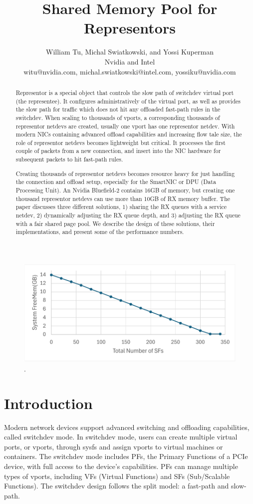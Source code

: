 \documentclass[letterpaper]{article}
\title{Shared Memory Pool for Representors}
\author{William Tu, Michal Swiatkowski, and Yossi Kuperman\\
Nvidia and Intel\\
witu@nvidia.com, michal.swiatkowski@intel.com, yossiku@nvidia.com\\
\newline
\newline
}
\begin{document}
 
\maketitle

\begin{abstract}
Representor is a special object that controls the slow path of
switchdev virtual port (the representee). It configures administratively
of the virtual port, as well as provides the slow path for traffic which
does not hit any offloaded fast-path rules in the switchdev.
When scaling to thousands of vports, a corresponding thousands of
representor netdevs are created, usually one vport has one representor
netdev. With modern NICs containing advanced offload capabilities
and increasing flow tale size, the role of representor netdevs becomes
lightweight but critical. It processes the first couple of packets
from a new connection, and insert into the NIC hardware for
subsequent packets to hit fast-path rules. 

Creating thousands of representor netdevs becomes resource heavy for
just handling the connection and offload setup, especially for the SmartNIC or
DPU (Data Processing Unit). An Nvidia Bluefield-2 contains 16GB
of memory, but creating one thousand representor netdevs can use
more than 10GB of RX memory buffer.
The paper discusses three different solutions, 1) sharing the RX queues
with a service netdev, 2) dynamically adjusting the RX queue depth,
and 3) adjusting the RX queue with a fair shared page pool.
We describe the design of these solutions, their implementations,
and present some of the performance numbers.


\end{abstract}
\begin{figure}[h]
\includegraphics[width=3.2
in]{freemem.pdf}
\caption{.}
\label{fig:arch}
\end{figure}

\section{Introduction}
Modern network devices support advanced switching and offloading
capabilities, called switchdev mode. In switchdev mode, users can
create multiple virtual ports, or vports, through sysfs and assign
vports to virtual machines or containers. The switchdev mode includes
PFs, the Primary Functions of a PCIe device, with full access to the device's
capabilities. PFs can manage multiple types of vports, including
VFs (Virtual Functions) and SFs (Sub/Scalable Functions).
The switchdev design follows the split model: a fast-path and
slow-path.
\end{document}
